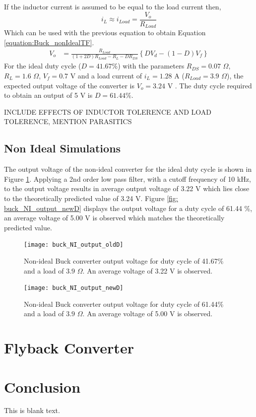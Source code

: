 \documentclass[12pt,twoside]{scrartcl}
\begin{document}
If the inductor current is assumed to be equal to the load current then,
\begin{equation*}
i_{L} \approx i_{Load} = \frac{V_{o}}{R_{Load}}
\end{equation*}
Which can be used with the previous equation to obtain Equation \ref{equation:Buck_nonIdealTF}.
\begin{align}
V_{o} &= \frac{R_{Load}}{(1+2D)R_{Load} - R_{L} - DR_{DS}}\left\{DV_{d} - (1-D)V_{f} \label{equation:Buck_nonIdealTF}\right\}
\end{align}
\noindent For the ideal duty cycle ($D = 41.67$\%) with the parameters $R_{DS} = 0.07$ $\Omega$, $R_{L} = 1.6$ $\Omega$, $V_{f} = 0.7$ V and a load current of $i_{L} = 1.28$ A ($R_{Load} = 3.9$ $\Omega$), the expected output voltage of the converter is $V_{o} =3.24$ V \cite{RNX1, RNX0, RNX2}. The duty cycle required to obtain an output of 5 V is $D = 61.44$\%.

INCLUDE EFFECTS OF INDUCTOR TOLERENCE AND LOAD TOLERENCE, MENTION PARASITICS

\newpage
\subsection{Non Ideal Simulations}
The output voltage of the non-ideal converter for the ideal duty cycle is shown in Figure \ref{fig:buck_NI_output_oldD}. Applying a 2nd order low pass filter, with a cutoff frequency of 10 kHz, to the output voltage results in average output voltage of 3.22 V which lies close to the theoretically predicted value of 3.24 V. Figure \ref{fig: buck_NI_output_newD} displays the output voltage for a duty cycle of 61.44 \%, an average voltage of 5.00 V is observed which matches the theoretically predicted value.

\begin{figure}[h]
    \centering
    \texttt{[image: buck\_NI\_output\_oldD]}
    \caption{Non-ideal Buck converter output voltage for duty cycle of 41.67\% and a load of $3.9$ $\Omega$. An average voltage of 3.22 V is observed.}
    \label{fig:buck_NI_output_oldD}
\end{figure}
\begin{figure}[h]
    \centering
    \texttt{[image: buck\_NI\_output\_newD]}
    \caption{Non-ideal Buck converter output voltage for duty cycle of 61.44\% and a load of $3.9$ $\Omega$. An average voltage of 5.00 V is observed.}
    \label{fig:buck_NI_output_newD}
\end{figure}

\newpage
\section{Flyback Converter}
\citep{BS412-EN}
\citep{jay1995write}
\newpage
\section{Conclusion}
This is blank text.
\newpage


\end{document}
